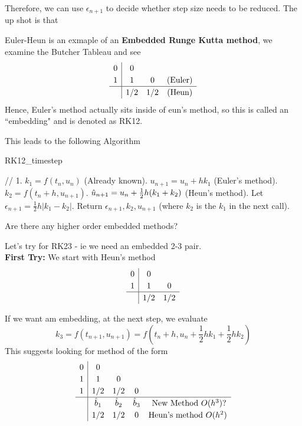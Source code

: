\documentclass{article}
\begin{document}
Therefore, we can use $\epsilon_{n+1}$ to decide whether step size needs to be reduced. The up shot is that
\begin{example}
    Euler-Heun is an exmaple of an \textbf{Embedded Runge Kutta method}, we examine the Butcher Tableau and see
    \[
\renewcommand\arraystretch{1.2}
\begin{array}
{c|cccc}
0 & 0\\
1 & 1 & 0 & (\text{Euler})\\
\hline
& 1/2 & 1/2 & (\text{Heun})
\end{array}
\]
Hence, Euler's method actually sits inside of eun's method, so this is called an ``embedding" and is denoted as RK12.
\end{example}

This leads to the following Algorithm
\begin{tcolorbox}[standard jigsaw,opacityback=0]
\begin{algorithm}[H]
\caption{RK12\_timestep}
// 1. $k_1 = f(t_n, u_n)$ (Already known). $u_{n+1} = u_n + h k_1$ (Euler's method). $k_2 = f(t_{n} + h, u_{n+1})$. $\Hat{u}_{n+1} = u_n + \frac{1}{2} h(k_1 + k_2)$\; (Heun's method). Let $\epsilon_{n+1} = \frac{1}{2} h |k_1 - k_2|$. Return $\epsilon_{n+1}, k_2, u_{n+1}$ (where $k_2$ is the $k_1$ in the next call).
\end{algorithm}
\end{tcolorbox}

\begin{question}
    Are there any higher order embedded methods?
\end{question}

Let's try for RK23 - ie we need an embedded 2-3 pair.\\

\textbf{First Try: } We start with Heun's method
    \[
\renewcommand\arraystretch{1.2}
\begin{array}
{c|cccc}
0 & 0\\
1 & 1 & 0\\
\hline
& 1/2 & 1/2 
\end{array}
\]

If we want am embedding, at the next step, we evaluate 
\[k_3 = f(t_{n+1}, u_{n+1}) = f(t_n + h, u_n + \frac{1}{2} h k_1 + \frac{1}{2} h k_2)\]
This suggests looking for method of the form
    \[
\renewcommand\arraystretch{1.2}
\begin{array}
{c|cccc}
0 & 0\\
1 & 1 & 0\\
1 & 1/2 & 1/2 & 0\\
\hline
& \hat{b}_1 & \hat{b}_2 & \hat{b}_3 & \text{ New Method $O(h^3)$?}\\
& 1/2 & 1/2 & 0 & \text{Heun's method $O(h^2)$}
\end{array}
\]
\end{document}
